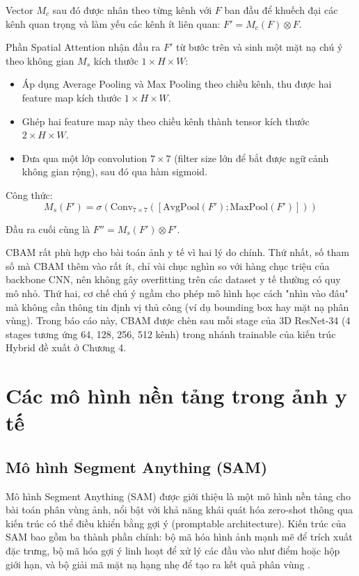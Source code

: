 Vector $M_c$ sau đó được nhân theo từng kênh với $F$ ban đầu để khuếch đại các kênh quan trọng và làm yếu các kênh ít liên quan: $F' = M_c(F) \otimes F$.

Phần Spatial Attention nhận đầu ra $F'$ từ bước trên và sinh một mặt nạ chú ý theo không gian $M_s$ kích thước $1 \times H \times W$:
\begin{itemize}
    \item Áp dụng Average Pooling và Max Pooling theo chiều kênh, thu được hai feature map kích thước $1 \times H \times W$.
    \item Ghép hai feature map này theo chiều kênh thành tensor kích thước $2 \times H \times W$.
    \item Đưa qua một lớp convolution $7 \times 7$ (filter size lớn để bắt được ngữ cảnh không gian rộng), sau đó qua hàm sigmoid.
\end{itemize}

Công thức:
$$M_s(F') = \sigma\left(\text{Conv}_{7\times 7}\left([\text{AvgPool}(F'); \text{MaxPool}(F')]\right)\right)$$

Đầu ra cuối cùng là $F'' = M_s(F') \otimes F'$.

CBAM rất phù hợp cho bài toán ảnh y tế vì hai lý do chính. Thứ nhất, số tham số mà CBAM thêm vào rất ít, chỉ vài chục nghìn so với hàng chục triệu của backbone CNN, nên không gây overfitting trên các dataset y tế thường có quy mô nhỏ. Thứ hai, cơ chế chú ý ngầm cho phép mô hình học cách "nhìn vào đâu" mà không cần thông tin định vị thủ công (ví dụ bounding box hay mặt nạ phân vùng). Trong báo cáo này, CBAM được chèn sau mỗi stage của 3D ResNet-34 (4 stages tương ứng 64, 128, 256, 512 kênh) trong nhánh trainable của kiến trúc Hybrid đề xuất ở Chương 4.


\section{Các mô hình nền tảng trong ảnh y tế}

\subsection{Mô hình Segment Anything (SAM)}
Mô hình Segment Anything (SAM) được giới thiệu là một mô hình nền tảng cho bài toán phân vùng ảnh, nổi bật với khả năng khái quát hóa zero-shot thông qua kiến trúc có thể điều khiển bằng gợi ý (promptable architecture). Kiến trúc của SAM bao gồm ba thành phần chính: bộ mã hóa hình ảnh mạnh mẽ để trích xuất đặc trưng, bộ mã hóa gợi ý linh hoạt để xử lý các đầu vào như điểm hoặc hộp giới hạn, và bộ giải mã mặt nạ hạng nhẹ để tạo ra kết quả phân vùng \cite{kirillov2023sam}.

